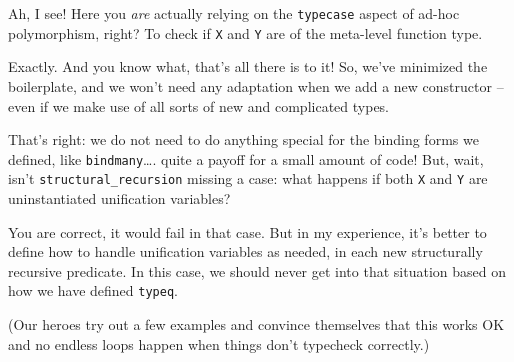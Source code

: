\heroSTUDENT{} Ah, I see! Here you \emph{are} actually relying on the
\texttt{typecase} aspect of ad-hoc polymorphism, right? To check if
\texttt{X} and \texttt{Y} are of the meta-level function type.

\heroADVISOR{} Exactly. And you know what, that's all there is to it! So,
we've minimized the boilerplate, and we won't need any adaptation when
we add a new constructor -- even if we make use of all sorts of new and
complicated types.

\heroSTUDENT{} That's right: we do not need to do anything special for the
binding forms we defined, like \texttt{bindmany}\ldots{}. quite a payoff
for a small amount of code! But, wait, isn't
\texttt{structural\_recursion} missing a case: what happens if both
\texttt{X} and \texttt{Y} are uninstantiated unification variables?

\heroADVISOR{} You are correct, it would fail in that case. But in my
experience, it's better to define how to handle unification variables as
needed, in each new structurally recursive predicate. In this case, we
should never get into that situation based on how we have defined
\texttt{typeq}.

\begin{scenecomment}
(Our heroes try out a few examples and convince themselves that this works OK and no endless loops happen when things don't typecheck correctly.)
\end{scenecomment}
